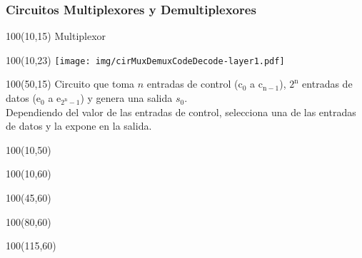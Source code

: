 \documentclass[aspectratio=169]{beamer}
\begin{document}
\begin{frame}[fragile]
    \frametitle{Circuitos Multiplexores y Demultiplexores}
    \begin{textblock}{100}(10,15) Multiplexor \end{textblock}
    \begin{textblock}{100}(10,23) \texttt{[image: img/cirMuxDemuxCodeDecode-layer1.pdf]} \end{textblock}
    \begin{textblock}{100}(50,15)
    \small Circuito que toma $n$ entradas de control ($\mathrm{c_0}$ a $\mathrm{c_{n-1}}$), $\mathrm{2^n}$ entradas de datos ($\mathrm{e_0}$ a $\mathrm{e_{2^n-1}}$) y genera una salida $s_0$.\\
    \bigskip
    Dependiendo del valor de las entradas de control, selecciona una de las entradas de datos y la expone en la salida.
    \end{textblock}
    \begin{textblock}{100}(10,50)   \end{textblock}
    \begin{textblock}{100}(10,60)   \end{textblock}
    \begin{textblock}{100}(45,60)   \end{textblock}
    \begin{textblock}{100}(80,60)   \end{textblock}
    \begin{textblock}{100}(115,60)  \end{textblock}
\end{frame}
\end{document}
